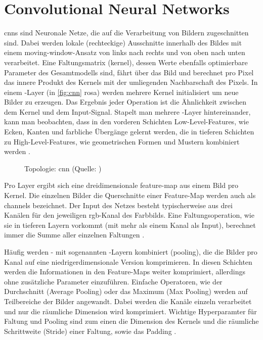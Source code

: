 \label{sec:conv}

\section{Convolutional Neural Networks}
\label{sec:cnn}

\glspl{cnn} sind Neuronale Netze, die auf die Verarbeitung von Bildern zugeschnitten sind.
Dabei werden lokale (rechteckige) Ausschnitte innerhalb des Bildes mit einem \gls{moving-window}-Ansatz von links nach rechts und von oben nach unten verarbeitet.
Eine Faltungsmatrix (\gls{kernel}), dessen Werte ebenfalls optimierbare Parameter des Gesamtmodells sind, fährt über das Bild und berechnet pro Pixel das innere Produkt des Kernels mit der umliegenden Nachbarschaft des Pixels.
In einem \conv-Layer (in \autoref{fig:cnn} rosa) werden mehrere Kernel initialisiert um neue Bilder zu erzeugen.
Das Ergebnis jeder Operation ist die Ähnlichkeit zwischen dem Kernel und dem Input-Signal.
Stapelt man mehrere \conv-Layer hintereinander, kann man beobachten, dass in den vorderen Schichten Low-Level-Features, wie Ecken, Kanten und farbliche Übergänge gelernt werden, die in tieferen Schichten zu High-Level-Features, wie geometrischen Formen und Mustern kombiniert werden \cite{Burkov19}.

\begin{figure}[hb!]
    \centering
    \caption{Topologie: \gls{cnn} (Quelle: \cite{Veen17})}
    \label{fig:cnn}
\end{figure}

Pro Layer ergibt sich eine dreidimensionale \gls{feature-map} aus einem Bild pro Kernel.
Die einzelnen Bilder \bzw die Querschnitte einer Feature-Map werden auch als \glspl{channel} bezeichnet.
Der Input des Netzes besteht typischerweise aus drei Kanälen für den jeweiligen \gls{rgb}-Kanal des Farbbilds.
Eine Faltungsoperation, wie sie in tieferen Layern vorkommt (mit mehr als einem Kanal als Input), berechnet immer die Summe aller einzelnen Faltungen \cite{Burkov19}.

Häufig werden \conv- mit sogenannten \pool-Layern kombiniert (\gls{pooling}), die die Bilder pro Kanal auf eine niedrigerdimensionale Version komprimieren.
In diesen Schichten werden die Informationen in den Feature-Maps weiter komprimiert, allerdings ohne zusätzliche Parameter einzuführen.
Einfache Operatoren, wie der Durchschnitt (Average Pooling) oder das Maximum (Max Pooling) werden auf Teilbereiche der Bilder angewandt.
Dabei werden die Kanäle einzeln verarbeitet und nur die räumliche Dimension wird komprimiert.
Wichtige Hyperparamter für Faltung und Pooling sind zum einen die Dimension des Kernels und die räumliche Schrittweite (Stride) einer Faltung, sowie das Padding  \cite{Burkov19}.

